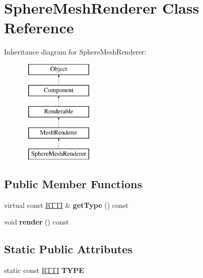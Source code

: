 \hypertarget{class_sphere_mesh_renderer}{
\section{SphereMeshRenderer Class Reference}
\label{class_sphere_mesh_renderer}
}
Inheritance diagram for SphereMeshRenderer:\begin{figure}[H]
\begin{center}
\leavevmode
\includegraphics[height=5.000000cm]{class_sphere_mesh_renderer}
\end{center}
\end{figure}
\subsection*{Public Member Functions}
\begin{DoxyCompactItemize}
\item 
\hypertarget{class_sphere_mesh_renderer_a74dd0471e210aee688fa2239030a2ef2}{
virtual const \hyperlink{class_r_t_t_i}{RTTI} \& {\bfseries getType} () const }
\label{class_sphere_mesh_renderer_a74dd0471e210aee688fa2239030a2ef2}

\item 
\hypertarget{class_sphere_mesh_renderer_a1a000a113c48518c519873ff214a60fb}{
void {\bfseries render} () const }
\label{class_sphere_mesh_renderer_a1a000a113c48518c519873ff214a60fb}

\end{DoxyCompactItemize}
\subsection*{Static Public Attributes}
\begin{DoxyCompactItemize}
\item 
\hypertarget{class_sphere_mesh_renderer_a14b09908d23ee74b4086c9428b621584}{
static const \hyperlink{class_r_t_t_i}{RTTI} {\bfseries TYPE}}
\label{class_sphere_mesh_renderer_a14b09908d23ee74b4086c9428b621584}

\end{DoxyCompactItemize}
